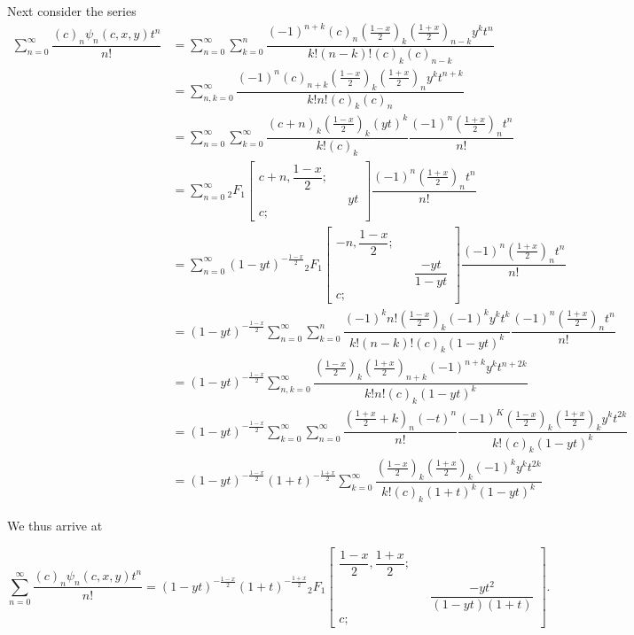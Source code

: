 \begin{solution}
Next consider the series
$$\begin{array}{ll}
\displaystyle\sum_{n=0}^{\infty} \dfrac{(c)_n \psi_n(c,x,y) t^n}{n!} &= \displaystyle\sum_{n=0}^{\infty} \displaystyle\sum_{k=0}^n \dfrac{(-1)^{n+k} (c)_n (\frac{1-x}{2})_k (\frac{1+x}{2})_{n-k} y^k t^n}{k! (n-k)! (c)_k (c)_{n-k}} \\
&= \displaystyle\sum_{n,k=0}^{\infty} \dfrac{(-1)^n (c)_{n+k} (\frac{1-x}{2})_k (\frac{1+x}{2})_n y^k t^{n+k}}{k! n! (c)_k (c)_n} \\
&= \displaystyle\sum_{n=0}^{\infty} \displaystyle\sum_{k=0}^{\infty} \dfrac{(c+n)_k (\frac{1-x}{2})_k (yt)^k}{k! (c)_k} \dfrac{(-1)^n (\frac{1+x}{2})_n t^n}{n!} \\
&= \displaystyle\sum_{n=0}^{\infty} {}_2F_1 \left[ \begin{array}{rlr}
c+n, \dfrac{1-x}{2}; & & \\
& & yt \\
c; & & 
\end{array} \right] \dfrac{(-1)^n (\frac{1+x}{2})_n t^n}{n!} \\
&= \displaystyle\sum_{n=0}^{\infty} (1-yt)^{-\frac{1-x}{2}} {}_2F_1 \left[ \begin{array}{rlr}
-n, \dfrac{1-x}{2}; & & \\
& & \dfrac{-yt}{1-yt} \\
c; & &
\end{array} \right] \dfrac{(-1)^n (\frac{1+x}{2})_n t^n}{n!} \\
&= (1-yt)^{-\frac{1-x}{2}} \displaystyle\sum_{n=0}^{\infty} \displaystyle\sum_{k=0}^n \dfrac{(-1)^k n! (\frac{1-x}{2})_k (-1)^k y^k t^k}{k! (n-k)! (c)_k (1-yt)^k} \dfrac{(-1)^n (\frac{1+x}{2})_n t^n}{n!} \\
&= (1-yt)^{-\frac{1-x}{2}} \displaystyle\sum_{n,k=0}^{\infty} \dfrac{(\frac{1-x}{2})_k (\frac{1+x}{2})_{n+k} (-1)^{n+k} y^k t^{n+2k}}{k! n! (c)_k (1-yt)^k} \\
&= (1-yt)^{-\frac{1-x}{2}} \displaystyle\sum_{k=0}^{\infty} \displaystyle\sum_{n=0}^{\infty} \dfrac{(\frac{1+x}{2}+k)_n (-t)^n}{n!} \dfrac{(-1)^K (\frac{1-x}{2})_k (\frac{1+x}{2})_k y^k t^{2k}}{k! (c)_k (1-yt)^k} \\
&= (1-yt)^{-\frac{1-x}{2}}(1+t)^{-\frac{1+x}{2}} \displaystyle\sum_{k=0}^{\infty} \dfrac{(\frac{1-x}{2})_k (\frac{1+x}{2})_k (-1)^k y^k t^{2k}}{k! (c)_k (1+t)^k (1-yt)^k}
\end{array}$$

We thus arrive at

$$\displaystyle\sum_{n=0}^{\infty} \dfrac{(c)_n \psi_n(c,x,y) t^n}{n!} = (1-yt)^{-\frac{1-x}{2}} (1+t)^{-\frac{1+x}{2}} {}_2F_1 \left[ \begin{array}{rlr}
\dfrac{1-x}{2}, \dfrac{1+x}{2}; & & \\
& & \dfrac{-yt^2}{(1-yt)(1+t)} \\
c; & &
\end{array} \right].$$


\end{solution}
